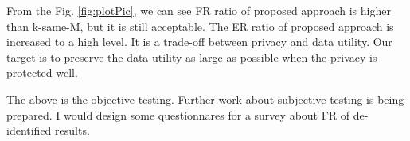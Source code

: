 	From the Fig. \ref{fig:plotPic}, we can see FR ratio of proposed approach is higher than k-same-M, but it is still acceptable. The ER ratio of proposed approach is increased to a high level. It is a trade-off between privacy and data utility. Our target is to preserve the data utility as large as possible when the privacy is protected well. 



The above is the objective testing. Further work about subjective testing is being prepared. I would design some questionnares for a survey about FR of de-identified results. 
